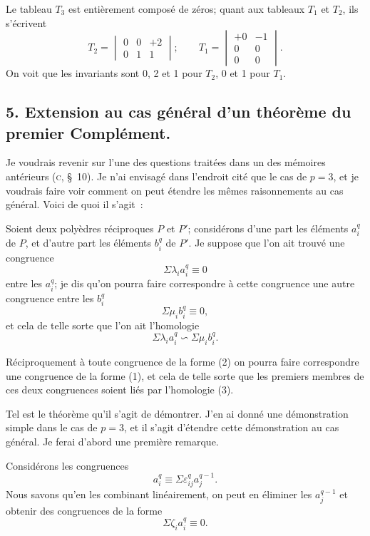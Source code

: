 \documentclass{article}
\begin{document}
Le tableau $T_{3}$ est entièrement composé de zéros; quant aux tableaux $T_{1}$ et $T_{2}$, ils s'écrivent
\[ T_{2} = \begin{vmatrix} 0 & 0 & +2 \\[1ex] 0 & 1 & 1 \end{vmatrix}; \qquad T_{1} = \begin{vmatrix} +0 & -1 \\[1ex] 0 & 0 \\[1ex] 0 & 0 \end{vmatrix}. \]
On voit que les invariants sont 0, 2 et 1 pour $T_{2}$, 0 et 1 pour $T_{1}$.

\subsection*{5. Extension au cas général d'un théorème du premier Complément.}

Je voudrais revenir sur l'une des questions traitées dans un des mémoires antérieurs (\textsc{c}, \S~10). Je n'ai envisagé dans l'endroit cité que le cas de $p = 3$, et je voudrais faire voir comment on peut étendre les mêmes raisonnements au cas général. Voici de quoi il s'agit~:

Soient deux polyèdres réciproques $P$ et $P'$; considérons d'une part les éléments $a^{q}_{i}$ de $P$, et d'autre part les éléments $b^{q}_{i}$ de $P'$. Je suppose que l'on ait trouvé une congruence
\[ \Sigma \lambda_{i} a^{q}_{i} \equiv 0 \tag{1} \]
entre les $a^{q}_{i}$; je dis qu'on pourra faire correspondre à cette congruence une autre congruence entre les $b^{q}_{i}$
\[ \Sigma \mu_{i} b^{q}_{i} \equiv 0, \tag{2} \]
et cela de telle sorte que l'on ait l'homologie
\[ \Sigma \lambda_{i} a^{q}_{i} \backsim \Sigma \mu_{i} b^{q}_{i}. \tag{3} \]

Réciproquement à toute congruence de la forme (2) on pourra faire correspondre une congruence de la forme (1), et cela de telle sorte que les premiers membres de ces deux congruences soient liés par l'homologie (3).

Tel est le théorème qu'il s'agit de démontrer. J'en ai donné une démonstration simple dans le cas de $p = 3$, et il s'agit d'étendre cette démonstration au cas général. Je ferai d'abord une première remarque.

Considérons les congruences
\[ a^{q}_{i} \equiv \Sigma \varepsilon^{q}_{ij} a^{q-1}_{j}. \tag{4} \]
Nous savons qu'en les combinant linéairement, on peut en éliminer les $a^{q-1}_{j}$ et obtenir des congruences de la forme
\[ \Sigma \zeta_{i} a^{q}_{i} \equiv 0. \tag{5} \]
\end{document}
